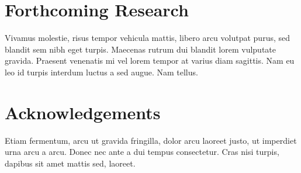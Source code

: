 \documentclass[a0,landscape]{a0poster}
\begin{document}
\begin{multicols}{4}
\section*{Forthcoming Research}

Vivamus molestie, risus tempor vehicula mattis, libero arcu volutpat purus, sed blandit sem nibh eget turpis. Maecenas rutrum dui blandit lorem vulputate gravida. Praesent venenatis mi vel lorem tempor at varius diam sagittis. Nam eu leo id turpis interdum luctus a sed augue. Nam tellus.



\printbibliography


\section*{Acknowledgements}

Etiam fermentum, arcu ut gravida fringilla, dolor arcu laoreet justo, ut imperdiet urna arcu a arcu. Donec nec ante a dui tempus consectetur. Cras nisi turpis, dapibus sit amet mattis sed, laoreet.


\end{multicols}
\end{document}
